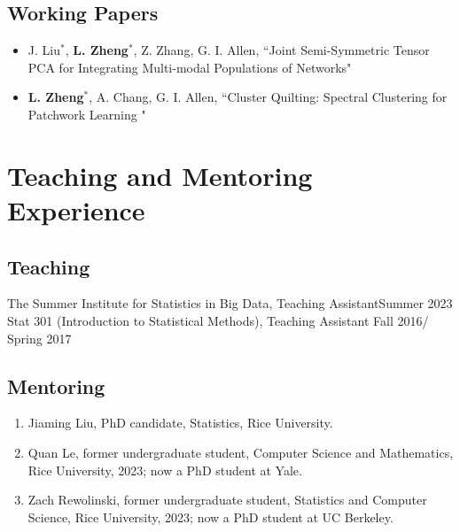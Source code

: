 \documentclass[letterpaper,11pt]{article}
\begin{document}
	\subsection*{Working Papers}
	\begin{itemize}
		\item J. Liu$^{*}$, {\bf L. Zheng}$^{*}$, Z. Zhang, G. I. Allen, ``Joint Semi-Symmetric Tensor PCA for Integrating Multi-modal Populations of Networks"
		\item {\bf L. Zheng}$^{*}$, A. Chang, G. I. Allen, ``Cluster Quilting: Spectral Clustering for Patchwork Learning "
	\end{itemize}
	\section{Teaching and Mentoring Experience}
	\subsection*{Teaching}
	The Summer Institute for Statistics in Big Data, Teaching Assistant\hfill Summer 2023\\
	Stat 301 (Introduction to Statistical Methods), Teaching Assistant \hfill Fall 2016/ Spring 2017
	\subsection*{Mentoring}
	\begin{enumerate}
		\item Jiaming Liu, PhD candidate, Statistics, Rice University.
		\item Quan Le, former undergraduate student, Computer Science and Mathematics, Rice University, 2023; now a PhD student at Yale.
		\item Zach Rewolinski, former undergraduate student, Statistics and Computer Science, Rice University, 2023; now a PhD student at UC Berkeley.
	\end{enumerate}
\end{document}
